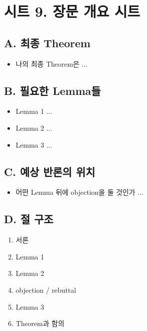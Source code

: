 \section{시트 9. 장문 개요 시트}\label{uxc2dcuxd2b8-9-uxc7a5uxbb38-uxac1cuxc694-uxc2dcuxd2b8}

\subsection{A. 최종 Theorem}\label{a-uxcd5cuxc885-theorem}

\begin{itemize}
\tightlist
\item
  나의 최종 Theorem은 ...
\end{itemize}

\subsection{B. 필요한 Lemma들}\label{b-uxd544uxc694uxd55c-lemmauxb4e4}

\begin{itemize}
\tightlist
\item
  Lemma 1 ...
\item
  Lemma 2 ...
\item
  Lemma 3 ...
\end{itemize}

\subsection{C. 예상 반론의 위치}\label{c-uxc608uxc0c1-uxbc18uxb860uxc758-uxc704uxce58}

\begin{itemize}
\tightlist
\item
  어떤 Lemma 뒤에 objection을 둘 것인가 ...
\end{itemize}

\subsection{D. 절 구조}\label{d-uxc808-uxad6cuxc870}

\begin{enumerate}
\def\labelenumi{\arabic{enumi}.}
\tightlist
\item
  서론
\item
  Lemma 1
\item
  Lemma 2
\item
  objection / rebuttal
\item
  Lemma 3
\item
  Theorem과 함의
\end{enumerate}

